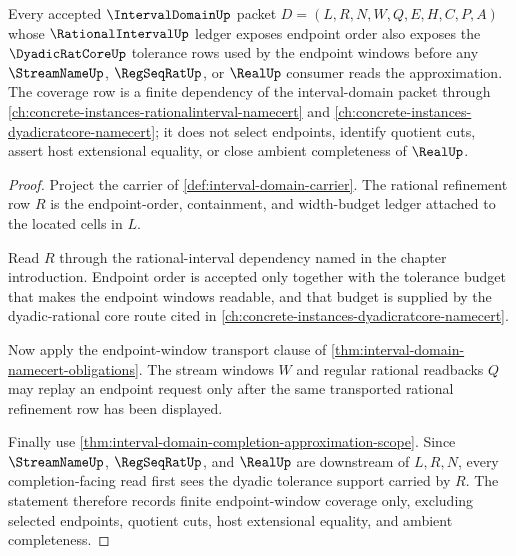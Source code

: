 \begin{theorem}
\label{thm:interval-domain-dyadic-endpoint-coverage}
Every accepted $\IntervalDomainUp$ packet $D=(L,R,N,W,Q,E,H,C,P,A)$ whose $\RationalIntervalUp$ ledger exposes endpoint order also exposes the $\DyadicRatCoreUp$ tolerance rows used by the endpoint windows before any $\StreamNameUp$, $\RegSeqRatUp$, or $\RealUp$ consumer reads the approximation. The coverage row is a finite dependency of the interval-domain packet through \autoref{ch:concrete-instances-rationalinterval-namecert} and \autoref{ch:concrete-instances-dyadicratcore-namecert}; it does not select endpoints, identify quotient cuts, assert host extensional equality, or close ambient completeness of $\RealUp$.
\end{theorem}
\begin{proof}
Project the carrier of \autoref{def:interval-domain-carrier}. The rational refinement row $R$ is the endpoint-order, containment, and width-budget ledger attached to the located cells in $L$.

Read $R$ through the rational-interval dependency named in the chapter introduction. Endpoint order is accepted only together with the tolerance budget that makes the endpoint windows readable, and that budget is supplied by the dyadic-rational core route cited in \autoref{ch:concrete-instances-dyadicratcore-namecert}.

Now apply the endpoint-window transport clause of \autoref{thm:interval-domain-namecert-obligations}. The stream windows $W$ and regular rational readbacks $Q$ may replay an endpoint request only after the same transported rational refinement row has been displayed.

Finally use \autoref{thm:interval-domain-completion-approximation-scope}. Since $\StreamNameUp$, $\RegSeqRatUp$, and $\RealUp$ are downstream of $L,R,N$, every completion-facing read first sees the dyadic tolerance support carried by $R$. The statement therefore records finite endpoint-window coverage only, excluding selected endpoints, quotient cuts, host extensional equality, and ambient completeness.
\end{proof}

